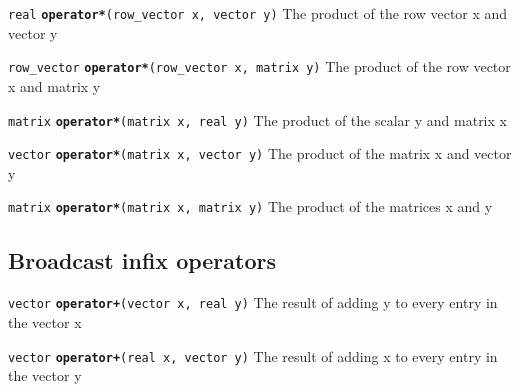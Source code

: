 \documentclass[
  10pt,
]{book}
\begin{document}

\texttt{real} \textbf{\texttt{operator*}}\texttt{(row\_vector\ x,\ vector\ y)}\newline
The product of the row vector x and vector y


\texttt{row\_vector} \textbf{\texttt{operator*}}\texttt{(row\_vector\ x,\ matrix\ y)}\newline
The product of the row vector x and matrix y


\texttt{matrix} \textbf{\texttt{operator*}}\texttt{(matrix\ x,\ real\ y)}\newline
The product of the scalar y and matrix x


\texttt{vector} \textbf{\texttt{operator*}}\texttt{(matrix\ x,\ vector\ y)}\newline
The product of the matrix x and vector y


\texttt{matrix} \textbf{\texttt{operator*}}\texttt{(matrix\ x,\ matrix\ y)}\newline
The product of the matrices x and y

\hypertarget{broadcast-infix-operators}{%
\subsection{Broadcast infix operators}\label{broadcast-infix-operators}}


\texttt{vector} \textbf{\texttt{operator+}}\texttt{(vector\ x,\ real\ y)}\newline
The result of adding y to every entry in the vector x


\texttt{vector} \textbf{\texttt{operator+}}\texttt{(real\ x,\ vector\ y)}\newline
The result of adding x to every entry in the vector y
\end{document}
